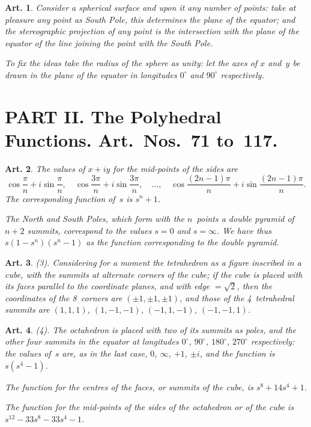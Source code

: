 \documentclass[11pt,a4paper]{article}
\theoremstyle{plain}
\newtheorem{art}{Art.}[section]
\begin{document}
\begin{art}
Consider a spherical surface and upon it any number of points: take at
pleasure any point as South Pole, this determines the plane of the
equator; and the stereographic projection of any point is the intersection
with the plane of the equator of the line joining the point with the South
Pole.

To fix the ideas take the radius of the sphere as unity: let the axes
of $x$ and~$y$ be drawn in the plane of the equator in longitudes $0^\circ$
and $90^\circ$ respectively.
\end{art}


\section*{PART II. The Polyhedral Functions. Art.~Nos.~71 to~117.}

\begin{art}
The values of $x + iy$ for the mid-points of the sides are
\[
\cos\frac{\pi}{n} + i\sin\frac{\pi}{n}, \quad
\cos\frac{3\pi}{n} + i\sin\frac{3\pi}{n}, \quad\ldots,\quad
\cos\frac{(2n-1)\pi}{n} + i\sin\frac{(2n-1)\pi}{n}.
\]
The corresponding function of~$s$ is $s^n + 1$.

The North and South Poles, which form with the $n$~points a double
pyramid of $n+2$ summits, correspond to the values $s = 0$ and $s = \infty$.
We have thus $s(1-s^n)(s^n-1)$ as the function corresponding to the
double pyramid.
\end{art}

\begin{art}
(3). Considering for a moment the tetrahedron as a figure inscribed in a
cube, with the summits at alternate corners of the cube; if the cube is
placed with its faces parallel to the coordinate planes, and with edge
$= \sqrt{2}$, then the coordinates of the 8~corners are $(\pm 1, \pm 1, \pm 1)$,
and those of the 4~tetrahedral summits are $(1,1,1)$, $(1,-1,-1)$,
$(-1,1,-1)$, $(-1,-1,1)$.
\end{art}

\begin{art}
(4). The octahedron is placed with two of its summits as poles, and the
other four summits in the equator at longitudes $0^\circ$, $90^\circ$, $180^\circ$,
$270^\circ$ respectively: the values of~$s$ are, as in the last case, $0$, $\infty$,
$+1$, $\pm i$, and the function is $s(s^4-1)$.

The function for the centres of the faces, or summits of the cube, is
$s^8 + 14s^4 + 1$.

The function for the mid-points of the sides of the octahedron or of the
cube is $s^{12} - 33s^8 - 33s^4 - 1$.
\end{art}
\end{document}
